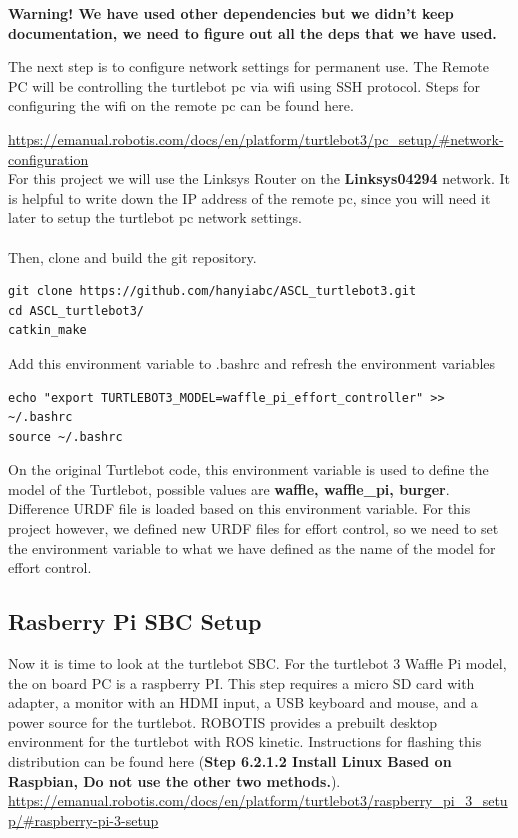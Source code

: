 \documentclass[12]{article}
\begin{document}
\textbf{Warning! We have used other dependencies but we didn't keep documentation, we need to figure out all the deps that we have used.}

The next step is to configure network settings for permanent use. 
The Remote PC will be controlling the turtlebot pc via wifi using SSH protocol. 
Steps for configuring the wifi on the remote pc can be found here.

\url {https://emanual.robotis.com/docs/en/platform/turtlebot3/pc_setup/#network-configuration} \\

For this project we will use the Linksys Router on the \textbf{Linksys04294} network. It is helpful to write down the IP address of the remote pc, since you will need it later to setup the turtlebot pc network settings.\\\\

Then, clone and build the git repository. 
\begin{lstlisting}[style=bash]
git clone https://github.com/hanyiabc/ASCL_turtlebot3.git
cd ASCL_turtlebot3/
catkin_make
\end{lstlisting}

Add this environment variable to .bashrc and refresh the environment variables
\begin{lstlisting}[style=bash]
echo "export TURTLEBOT3_MODEL=waffle_pi_effort_controller" >> ~/.bashrc
source ~/.bashrc
\end{lstlisting}
On the original Turtlebot code, this environment variable is used to define the model of the Turtlebot, possible values are \textbf{waffle, waffle\_pi, burger}. 
Difference URDF file is loaded based on this environment variable. 
For this project however, we defined new URDF files for effort control, so we need to set the environment variable to what we have defined as the name of the model for effort control. 
\subsection{Rasberry Pi SBC Setup}

Now it is time to look at the turtlebot SBC. For the turtlebot 3 Waffle Pi model, the on board PC is a raspberry PI. 
This step requires a micro SD card with adapter, a monitor with an HDMI input, a USB keyboard and mouse, and a power source for the turtlebot. 
ROBOTIS provides a prebuilt desktop environment for the turtlebot with ROS kinetic. Instructions for flashing this distribution can be found here (\textbf{Step 6.2.1.2 Install Linux Based on Raspbian, Do not use the other two methods.}).\\
\url {https://emanual.robotis.com/docs/en/platform/turtlebot3/raspberry_pi_3_setup/#raspberry-pi-3-setup}
\end{document}
